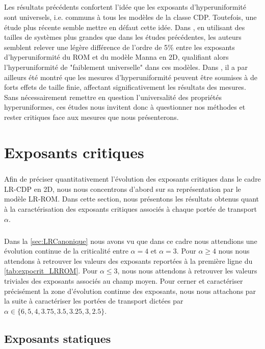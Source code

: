 \subparagraph{}Les résultats précédents confortent l'idée que les exposants d'hyperuniformité sont universels, i.e. communs à tous les modèles de la classe CDP. Toutefois, une étude plus récente semble mettre en défaut cette idée. Dans \cite{bub_lee_hyperuniformity_2019}, en utilisant des tailles de systèmes plus grandes que dans les études précédentes, les auteurs semblent relever une légère différence de l'ordre de 5\% entre les exposants d'hyperuniformité du ROM et du modèle Manna en 2D, qualifiant alors l'hyperuniformité de "faiblement universelle" dans ces modèles. Dans \cite{wiese_hyperuniformity_2024}, il a par ailleurs été montré que les mesures d'hyperuniformité peuvent être soumises à de forts effets de taille finie, affectant significativement les résultats des mesures. Sans nécessairement remettre en question l'universalité des propriétés hyperuniformes, ces études nous invitent donc à questionner nos méthodes et rester critiques face aux mesures que nous présenterons.

\section{Exposants critiques}

\subparagraph{}Afin de préciser quantitativement l'évolution des exposants critiques dans le cadre LR-CDP en 2D, nous nous concentrons d'abord sur sa représentation par le modèle LR-ROM. Dans cette section, nous présentons les résultats obtenus quant à la caractérisation des exposants critiques associés à chaque portée de transport $\alpha$.

\subparagraph{}Dans la \autoref{sec:LRCanonique} nous avons vu que dans ce cadre nous attendions une évolution continue de la criticalité entre $\alpha = 4$ et $\alpha=3$. Pour $\alpha\geq 4$ nous nous attendons à retrouver les valeurs des exposants reportées à la première ligne du \autoref{tab:expocrit_LRROM}. Pour $\alpha\leq 3$, nous nous attendons à retrouver les valeurs triviales des exposants associés au champ moyen. Pour cerner et caractériser précisément la zone d'évolution continue des exposants, nous nous attachons par la suite à caractériser les portées de transport dictées par $\alpha \in \{ 6, 5, 4, 3.75, 3.5, 3.25, 3, 2.5  \}$.

\label{sec:expcritjumps}

\subsection{Exposants statiques}

